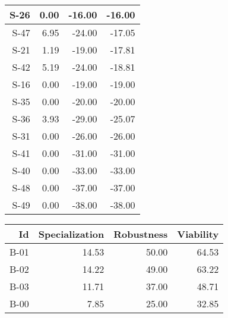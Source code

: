\begin{tabular}{ | r | r | r | r | }
    \hline
                  S-26  &            0.00  &          -16.00  &          -16.00  \\
    \hline
                  S-47  &            6.95  &          -24.00  &          -17.05  \\
    \hline
                  S-21  &            1.19  &          -19.00  &          -17.81  \\
    \hline
                  S-42  &            5.19  &          -24.00  &          -18.81  \\
    \hline
                  S-16  &            0.00  &          -19.00  &          -19.00  \\
    \hline
                  S-35  &            0.00  &          -20.00  &          -20.00  \\
    \hline
                  S-36  &            3.93  &          -29.00  &          -25.07  \\
    \hline
                  S-31  &            0.00  &          -26.00  &          -26.00  \\
    \hline
                  S-41  &            0.00  &          -31.00  &          -31.00  \\
    \hline
                  S-40  &            0.00  &          -33.00  &          -33.00  \\
    \hline
                  S-48  &            0.00  &          -37.00  &          -37.00  \\
    \hline
                  S-49  &            0.00  &          -38.00  &          -38.00  \\
    \hline
\end{tabular}


\begin{tabular}{ | r | r | r | r | }
    \hline
                    Id  &  Specialization  &      Robustness  &       Viability  \\
    \hline
    \hline
                  B-01  &           14.53  &           50.00  &           64.53  \\
    \hline
                  B-02  &           14.22  &           49.00  &           63.22  \\
    \hline
                  B-03  &           11.71  &           37.00  &           48.71  \\
    \hline
                  B-00  &            7.85  &           25.00  &           32.85  \\
    \hline
\end{tabular}



